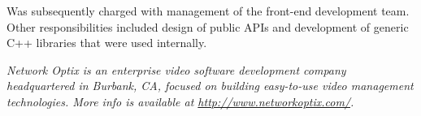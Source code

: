 \documentclass[margin,line]{CV}
\def\superofficial{}
\begin{document}
\begin{resume}
\ifdefined\superofficial
    \pagebreak
\fi
    
    Was subsequently charged with management of the front-end development team. Other responsibilities included design of public APIs and development of generic C++ libraries that were used internally.
    
    

\ifdefined\superofficial
    {\footnotesize\textit{Network Optix is an enterprise video software development company headquartered in Burbank, CA, focused on building easy-to-use video management technologies. More info is available at \url{http://www.networkoptix.com/}.}}
\fi
    
\ifdefined\superofficial\else
    \pagebreak    
\fi

    


    

\end{resume}
\end{document}
